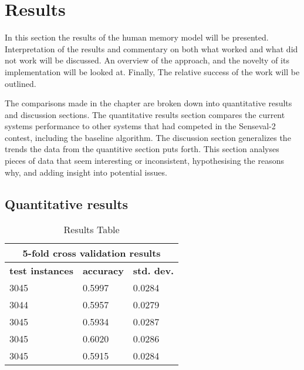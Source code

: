 \chapter{Results}

In this section the results of the human memory model will be presented.
Interpretation of the results and commentary on both what worked and what did
not work will be discussed. An overview of the approach, and the novelty of its
implementation will be looked at. Finally, The relative success of the work will
be outlined.

The comparisons made in the chapter are broken down into quantitative results
and discussion sections. The quantitative results section compares the current
systems performance to other systems that had competed in the Senseval-2
contest, including the baseline algorithm.  The discussion section generalizes
the trends the data from the quantitive section puts forth. This section
analyses pieces of data that seem interesting or inconsistent, hypothesising the
reasons why, and adding insight into potential issues.

\section{Quantitative results}

\begin{table}[htp]     \begin{center}         \begin{tabular}{|l|l|l|}
\hline                 \multicolumn{3}{|c|}{\bf 5-fold cross validation results
} \\                 \hline                 {\bf test instances} & {\bf
accuracy} & {\bf std. dev.} \\ \hline                  3045 & 0.5997 & 0.0284
\\ \hline                  3044 & 0.5957 & 0.0279 \\ \hline
3045 & 0.5934 & 0.0287 \\ \hline                  3045 & 0.6020 & 0.0286 \\
\hline                  3045 & 0.5915 & 0.0284 \\ \hline         \end{tabular}
\caption{Results Table \label{table:RESULTS}}     \end{center} \end{table}

